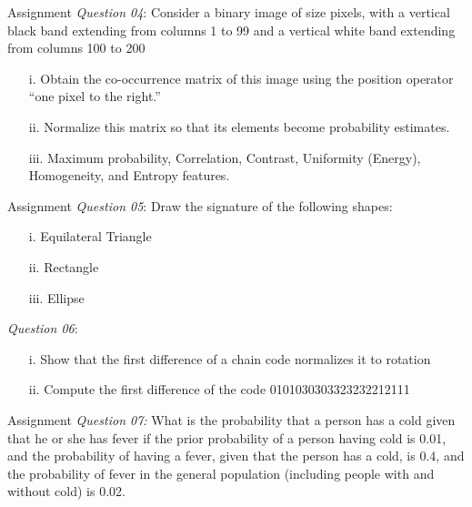 \begin{frame}{Assignment}
\textit{\color{slidecolor}Question 04}: Consider a binary image of size pixels, with a vertical black band extending from columns 1 to 99 and a vertical white band extending from columns 100 to 200
\begin{itemize}
\item[i.] Obtain the co-occurrence matrix of this image using the position operator
``one pixel to the right.''
\item[ii.]Normalize this matrix so that its elements become probability estimates.
\item[iii.] Maximum probability, Correlation, Contrast, Uniformity (Energy), Homogeneity, and Entropy features.
\end{itemize}
\end{frame}

\begin{frame}{Assignment}
\textit{\color{slidecolor}Question 05}: Draw the signature of the following shapes:
\begin{itemize}
\item[i.] Equilateral Triangle
\item[ii.] Rectangle
\item[iii.] Ellipse
\end{itemize}
\textit{\color{slidecolor}Question 06}:
\begin{itemize}
\item[i.] Show that the first difference of a chain code normalizes it to rotation
\item[ii.] Compute the first difference of the code 0101030303323232212111
\end{itemize}
\end{frame}



\begin{frame}{Assignment}
\textit{\color{slidecolor}Question 07:} What is the probability that a person has a cold given that he or she has fever if the prior probability of a person having cold is 0.01, and the probability of having a fever, given that the person has a cold, is 0.4, and the probability of fever in the general population (including people with and without cold) is 0.02.
\end{frame}

